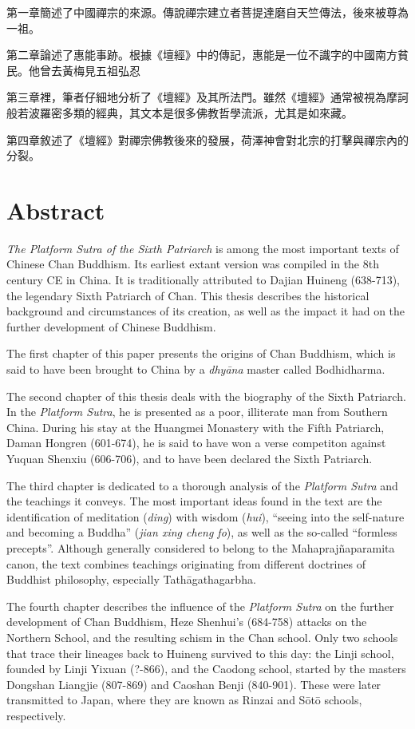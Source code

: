 第一章簡述了中國禪宗的來源。傳說禪宗建立者菩提達磨自天竺傳法，後來被尊為一祖。

第二章論述了惠能事跡。根據《壇經》中的傳記，惠能是一位不識字的中國南方貧民。他曾去黃梅見五祖弘忍

第三章裡，筆者仔細地分析了《壇經》及其所法門。雖然《壇經》通常被視為摩訶般若波羅密多類的經典，其文本是很多佛教哲學流派，尤其是如來藏。

第四章敘述了《壇經》對禪宗佛教後來的發展，荷澤神會對北宗的打擊與禪宗內的分裂。

\chapter*{Abstract}
\textit{The Platform Sutra of the Sixth Patriarch} is among the most important texts of Chinese Chan Buddhism.
Its earliest extant version was compiled in the 8th century CE in China.
It is traditionally attributed to Dajian Huineng (638-713), the legendary Sixth Patriarch of Chan.
This thesis describes the historical background and circumstances of its creation, as well as the impact it had on the further development of Chinese Buddhism.

The first chapter of this paper presents the origins of Chan Buddhism, which is said to have been brought to China by a \textit{dhyāna} master called Bodhidharma.

The second chapter of this thesis deals with the biography of the Sixth Patriarch.
In the \textit{Platform Sutra}, he is presented as a poor, illiterate man from Southern China.
During his stay at the Huangmei Monastery with the Fifth Patriarch, Daman Hongren (601-674), he is said to have won a verse competiton against Yuquan Shenxiu (606-706), and to have been declared the Sixth Patriarch.

The third chapter is dedicated to a thorough analysis of the \textit{Platform Sutra} and the teachings it conveys.
The most important ideas found in the text are the identification of meditation (\textit{ding}) with wisdom (\textit{hui}), ``seeing into the self-nature and becoming a Buddha'' (\textit{jian xing cheng fo}), as well as the so-called ``formless precepts''.
Although generally considered to belong to the Mahaprajñaparamita canon, the text combines teachings originating from different doctrines of Buddhist philosophy, especially Tathāgathagarbha.

The fourth chapter describes the influence of the \textit{Platform Sutra} on the further development of Chan Buddhism, Heze Shenhui's (684-758) attacks on the Northern School, and the resulting schism in the Chan school.
Only two schools that trace their lineages back to Huineng survived to this day: the Linji school, founded by Linji Yixuan (?-866), and the Caodong school, started by the masters Dongshan Liangjie (807-869) and Caoshan Benji (840-901).
These were later transmitted to Japan, where they are known as Rinzai and Sōtō schools, respectively.

